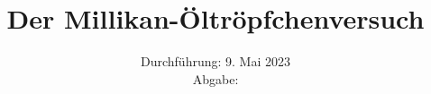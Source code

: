 

\subject{\texorpdfstring{\vspace{2ex}}{}V503\texorpdfstring{\vspace{-2ex}}{}} %
\title{Der Millikan-Öltröpfchenversuch} %
\date{
	Durchführung: 9. Mai 2023 %
	\\ Abgabe:%
}




\maketitle
\thispagestyle{empty}


\tableofcontents
\newpage







\printbibliography{}

\newpage



